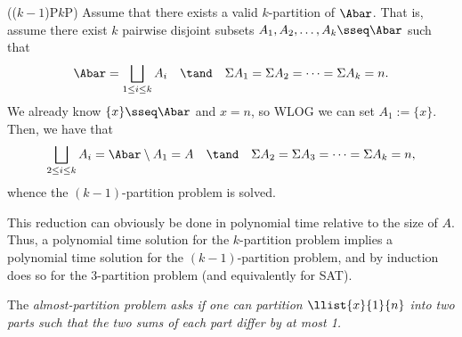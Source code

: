 \documentclass{article}
\begin{document}
\begin{solution}
\begin{subproof}[Correctness.]
    ((\( k-1 \))P\pmi \( k \)P)
    Assume that there exists a valid \( k \)-partition of \( \Abar \).
    That is, assume there exist \( k \) pairwise disjoint subsets \( A_1, A_2, \ldots, A_k \sseq \Abar \) such that \begin{align*}
      \Abar = \bigsqcup_{1\leq i \leq k}A_{i} \quad \tand \quad \Sigma A_1 = \Sigma A_2 = \cdots = \Sigma A_{k} = n.
    \end{align*}
    We already know \( \{x\}\sseq \Abar \) and \( x=n \), so WLOG we can set \( A_1 := \{x\} \).
    Then, we have that \begin{align*}
      \bigsqcup_{2\leq i \leq k}A_{i} = \Abar \setminus A_1 = A \quad \tand \quad \Sigma A_2 = \Sigma A_3 = \cdots = \Sigma A_{k} = n,
    \end{align*}
    whence the \( (k-1) \)-partition problem is solved.
  \end{subproof}
  This reduction can obviously be done in polynomial time relative to the size of \( A \).
  Thus, a polynomial time solution for the \( k \)-partition problem implies a polynomial time solution for the \( (k-1) \)-partition problem, and by induction does so for the 3-partition problem (and equivalently for SAT).
\end{solution}
\pagebreak


\begin{subexercise}
  The \it{almost-partition problem} asks if one can partition \( \llist{x}{1}{n} \) into two parts such that the two sums of each part differ by at most 1.
\end{subexercise}
\end{document}
